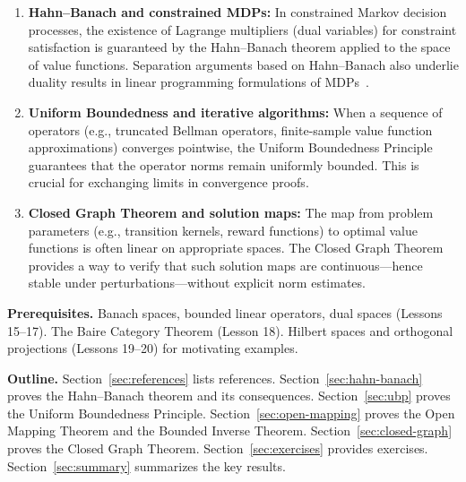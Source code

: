 \documentclass[11pt,a4paper]{article}
\begin{document}
\begin{rlconnection}[title={Why the Fundamental Theorems Matter for RL}]
\begin{enumerate}[leftmargin=2em,nosep]
    \item \textbf{Hahn--Banach and constrained MDPs:} In constrained
          Markov decision processes, the existence of Lagrange multipliers
          (dual variables) for constraint satisfaction is guaranteed by
          the Hahn--Banach theorem applied to the space of value
          functions. Separation arguments based on Hahn--Banach also
          underlie duality results in linear programming formulations of
          MDPs~\citep{puterman2014}.
    \item \textbf{Uniform Boundedness and iterative algorithms:} When a
          sequence of operators (e.g., truncated Bellman operators,
          finite-sample value function approximations) converges
          pointwise, the Uniform Boundedness Principle guarantees that
          the operator norms remain uniformly bounded. This is crucial
          for exchanging limits in convergence proofs.
    \item \textbf{Closed Graph Theorem and solution maps:} The
          map from problem parameters (e.g., transition kernels, reward
          functions) to optimal value functions is often linear on
          appropriate spaces. The Closed Graph Theorem provides a way
          to verify that such solution maps are continuous---hence
          stable under perturbations---without explicit norm estimates.
\end{enumerate}
\end{rlconnection}

\medskip
\noindent\textbf{Prerequisites.} Banach spaces, bounded linear operators,
dual spaces (Lessons 15--17). The Baire Category Theorem (Lesson 18).
Hilbert spaces and orthogonal projections (Lessons 19--20) for
motivating examples.

\medskip
\noindent\textbf{Outline.}
Section~\ref{sec:references} lists references.
Section~\ref{sec:hahn-banach} proves the Hahn--Banach theorem and its
consequences.
Section~\ref{sec:ubp} proves the Uniform Boundedness Principle.
Section~\ref{sec:open-mapping} proves the Open Mapping Theorem and the
Bounded Inverse Theorem.
Section~\ref{sec:closed-graph} proves the Closed Graph Theorem.
Section~\ref{sec:exercises} provides exercises.
Section~\ref{sec:summary} summarizes the key results.

\end{document}
